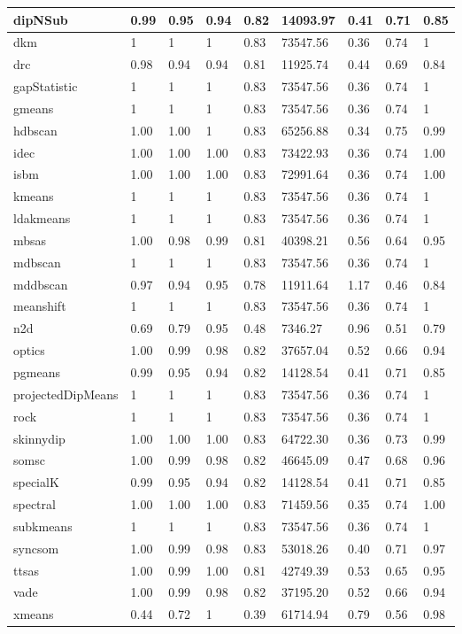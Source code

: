 \begin{table}[H]
\begin{tabular}{|l|l|l|l|l|l|l|l|l|}
\hline
dipNSub & 0.99 & 0.95 & 0.94 & 0.82 & 14093.97 & 0.41 & 0.71 & 0.85 \\
\hline
dkm & 1 & 1 & 1 & 0.83 & 73547.56 & 0.36 & 0.74 & 1 \\
\hline
drc & 0.98 & 0.94 & 0.94 & 0.81 & 11925.74 & 0.44 & 0.69 & 0.84 \\
\hline
gapStatistic & 1 & 1 & 1 & 0.83 & 73547.56 & 0.36 & 0.74 & 1 \\
\hline
gmeans & 1 & 1 & 1 & 0.83 & 73547.56 & 0.36 & 0.74 & 1 \\
\hline
hdbscan & 1.00 & 1.00 & 1 & 0.83 & 65256.88 & 0.34 & 0.75 & 0.99 \\
\hline
idec & 1.00 & 1.00 & 1.00 & 0.83 & 73422.93 & 0.36 & 0.74 & 1.00 \\
\hline
isbm & 1.00 & 1.00 & 1.00 & 0.83 & 72991.64 & 0.36 & 0.74 & 1.00 \\
\hline
kmeans & 1 & 1 & 1 & 0.83 & 73547.56 & 0.36 & 0.74 & 1 \\
\hline
ldakmeans & 1 & 1 & 1 & 0.83 & 73547.56 & 0.36 & 0.74 & 1 \\
\hline
mbsas & 1.00 & 0.98 & 0.99 & 0.81 & 40398.21 & 0.56 & 0.64 & 0.95 \\
\hline
mdbscan & 1 & 1 & 1 & 0.83 & 73547.56 & 0.36 & 0.74 & 1 \\
\hline
mddbscan & 0.97 & 0.94 & 0.95 & 0.78 & 11911.64 & 1.17 & 0.46 & 0.84 \\
\hline
meanshift & 1 & 1 & 1 & 0.83 & 73547.56 & 0.36 & 0.74 & 1 \\
\hline
n2d & 0.69 & 0.79 & 0.95 & 0.48 & 7346.27 & 0.96 & 0.51 & 0.79 \\
\hline
optics & 1.00 & 0.99 & 0.98 & 0.82 & 37657.04 & 0.52 & 0.66 & 0.94 \\
\hline
pgmeans & 0.99 & 0.95 & 0.94 & 0.82 & 14128.54 & 0.41 & 0.71 & 0.85 \\
\hline
projectedDipMeans & 1 & 1 & 1 & 0.83 & 73547.56 & 0.36 & 0.74 & 1 \\
\hline
rock & 1 & 1 & 1 & 0.83 & 73547.56 & 0.36 & 0.74 & 1 \\
\hline
skinnydip & 1.00 & 1.00 & 1.00 & 0.83 & 64722.30 & 0.36 & 0.73 & 0.99 \\
\hline
somsc & 1.00 & 0.99 & 0.98 & 0.82 & 46645.09 & 0.47 & 0.68 & 0.96 \\
\hline
specialK & 0.99 & 0.95 & 0.94 & 0.82 & 14128.54 & 0.41 & 0.71 & 0.85 \\
\hline
spectral & 1.00 & 1.00 & 1.00 & 0.83 & 71459.56 & 0.35 & 0.74 & 1.00 \\
\hline
subkmeans & 1 & 1 & 1 & 0.83 & 73547.56 & 0.36 & 0.74 & 1 \\
\hline
syncsom & 1.00 & 0.99 & 0.98 & 0.83 & 53018.26 & 0.40 & 0.71 & 0.97 \\
\hline
ttsas & 1.00 & 0.99 & 1.00 & 0.81 & 42749.39 & 0.53 & 0.65 & 0.95 \\
\hline
vade & 1.00 & 0.99 & 0.98 & 0.82 & 37195.20 & 0.52 & 0.66 & 0.94 \\
\hline
xmeans & 0.44 & 0.72 & 1 & 0.39 & 61714.94 & 0.79 & 0.56 & 0.98 \\
\hline
\end{tabular}
\end{table}
